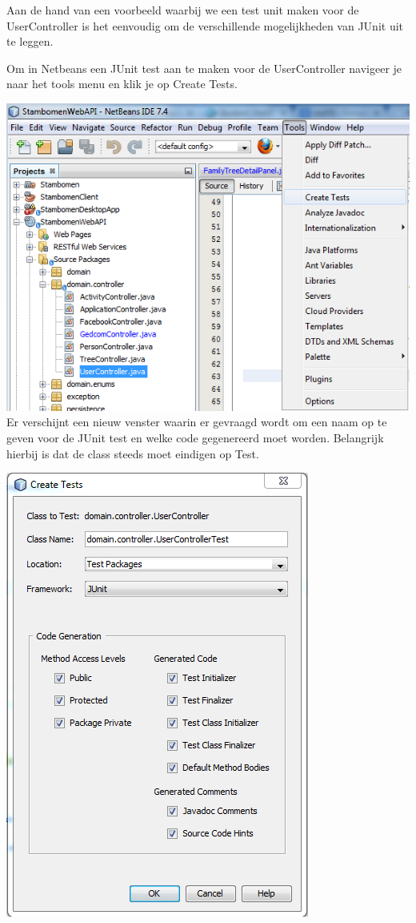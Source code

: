 \documentclass[pdftex,a4paper,12pt,twoside]{report}
\begin{document}
Aan de hand van een voorbeeld waarbij we een test unit maken voor de UserController is het eenvoudig om de verschillende mogelijkheden van JUnit uit te leggen.

Om in Netbeans een JUnit test aan te maken voor de UserController navigeer je naar het tools menu en klik je op Create Tests.

\includegraphics{images/netbeansjunit.png}\\

Er verschijnt een nieuw venster waarin er gevraagd wordt om een naam op te geven voor de JUnit test en welke code gegenereerd moet worden. Belangrijk hierbij is dat de class steeds moet eindigen op Test.

\includegraphics{images/netbeansjunit2.png}\\
\end{document}
